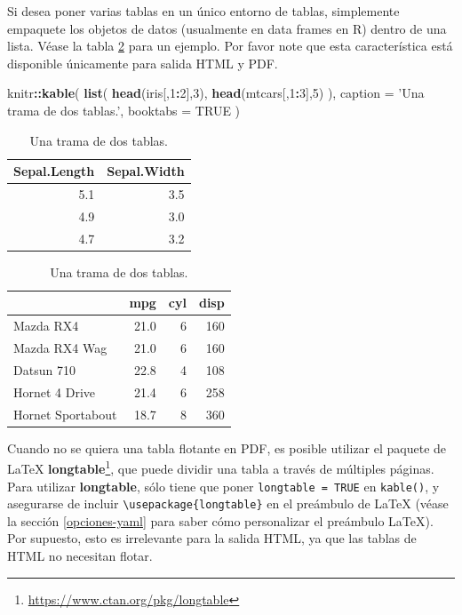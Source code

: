 \documentclass[12pt,]{krantz}
\makeatletter
\newenvironment{Shaded}{\begin{snugshade}}{\end{snugshade}}
\newcommand{\KeywordTok}[1]{\textcolor[rgb]{0.13,0.29,0.53}{\textbf{#1}}}
\newcommand{\DataTypeTok}[1]{\textcolor[rgb]{0.13,0.29,0.53}{#1}}
\newcommand{\DecValTok}[1]{\textcolor[rgb]{0.00,0.00,0.81}{#1}}
\newcommand{\StringTok}[1]{\textcolor[rgb]{0.31,0.60,0.02}{#1}}
\newcommand{\OtherTok}[1]{\textcolor[rgb]{0.56,0.35,0.01}{#1}}
\newcommand{\OperatorTok}[1]{\textcolor[rgb]{0.81,0.36,0.00}{\textbf{#1}}}
\newcommand{\NormalTok}[1]{#1}
\renewcommand{\href}[2]{#2\footnote{\url{#1}}}
\newenvironment{kframe}{%
\medskip{}
\setlength{\fboxsep}{.8em}
 \def\at@end@of@kframe{}%
 \ifinner\ifhmode%
  \def\at@end@of@kframe{\end{minipage}}%
  \begin{minipage}{\columnwidth}%
 \fi\fi%
 \def\FrameCommand##1{\hskip\@totalleftmargin \hskip-\fboxsep
 \colorbox{shadecolor}{##1}\hskip-\fboxsep
     \hskip-\linewidth \hskip-\@totalleftmargin \hskip\columnwidth}%
 \MakeFramed {\advance\hsize-\width
   \@totalleftmargin\z@ \linewidth\hsize
   \@setminipage}}%
 {\par\unskip\endMakeFramed%
 \at@end@of@kframe}
\renewenvironment{Shaded}{\begin{kframe}}{\end{kframe}}
\theoremstyle{definition}
\theoremstyle{definition}
\theoremstyle{definition}
\theoremstyle{remark}
\makeatother
\begin{document}
Si desea poner varias tablas en un único entorno de tablas, simplemente
empaquete los objetos de datos (usualmente en data frames en R) dentro
de una lista. Véase la tabla \ref{tab:table-multi} para un ejemplo. Por
favor note que esta característica está disponible únicamente para
salida HTML y PDF.

\begin{Shaded}
\begin{Highlighting}[]
\NormalTok{knitr}\OperatorTok{::}\KeywordTok{kable}\NormalTok{(}
  \KeywordTok{list}\NormalTok{(}
    \KeywordTok{head}\NormalTok{(iris[,}\DecValTok{1}\OperatorTok{:}\DecValTok{2}\NormalTok{],}\DecValTok{3}\NormalTok{),}
    \KeywordTok{head}\NormalTok{(mtcars[,}\DecValTok{1}\OperatorTok{:}\DecValTok{3}\NormalTok{],}\DecValTok{5}\NormalTok{)}
\NormalTok{  ),}
  \DataTypeTok{caption =} \StringTok{'Una trama de dos tablas.'}\NormalTok{, }\DataTypeTok{booktabs =} \OtherTok{TRUE}
\NormalTok{)}
\end{Highlighting}
\end{Shaded}

\begin{table}
\caption{\label{tab:table-multi}Una trama de dos tablas.}

\centering
\begin{tabular}[t]{rr}
\toprule
Sepal.Length & Sepal.Width\\
\midrule
5.1 & 3.5\\
4.9 & 3.0\\
4.7 & 3.2\\
\bottomrule
\end{tabular}
\centering
\begin{tabular}[t]{lrrr}
\toprule
  & mpg & cyl & disp\\
\midrule
Mazda RX4 & 21.0 & 6 & 160\\
Mazda RX4 Wag & 21.0 & 6 & 160\\
Datsun 710 & 22.8 & 4 & 108\\
Hornet 4 Drive & 21.4 & 6 & 258\\
Hornet Sportabout & 18.7 & 8 & 360\\
\bottomrule
\end{tabular}
\end{table}

Cuando no se quiera una tabla flotante en PDF, es posible utilizar el
paquete de LaTeX
\href{https://www.ctan.org/pkg/longtable}{\textbf{longtable}}, que puede
dividir una tabla a través de múltiples páginas. Para utilizar
\textbf{longtable}, sólo tiene que poner \texttt{longtable\ =\ TRUE} en
\texttt{kable()}, y asegurarse de incluir
\texttt{\textbackslash{}usepackage\{longtable\}} en el preámbulo de
LaTeX (véase la sección \ref{opciones-yaml} para saber cómo personalizar
el preámbulo LaTeX). Por supuesto, esto es irrelevante para la salida
HTML, ya que las tablas de HTML no necesitan flotar.
\end{document}
